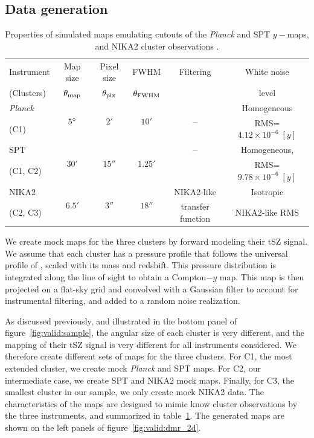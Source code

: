 \subsection{Data generation} \label{sec:simu:mkdata}

\begin{table}[htp]
    \centering
    \begin{tabular}{l c c c c c}
        \toprule
        Instrument & Map size & Pixel size & FWHM & Filtering & White noise \\
        (Clusters) & $\theta_{\rm map}$ & $\theta_{\rm pix}$ & $\theta_{\rm FWHM}$ & & level \\
        \midrule
        \textit{Planck} & \multirow{2}{*}{$5\degree$} & \multirow{2}{*}{$2'$} & \multirow{2}{*}{$10'$} & \multirow{2}{*}{--} & Homogeneous \\
        (C1) & & & & & RMS=$4.12 \times 10^{-6} \; [y]$ \\
        \midrule
        SPT & \multirow{2}{*}{$30'$} & \multirow{2}{*}{$15''$} & \multirow{2}{*}{$1.25'$} & -- & Homogeneous, \\
        (C1, C2) & & & & & RMS=$9.78 \times 10^{-6} \; [y]$ \\
        \midrule
        NIKA2 & \multirow{2}{*}{$6.5'$} & \multirow{2}{*}{$3''$} & \multirow{2}{*}{$18''$} & NIKA2-like & Isotropic \\
        (C2, C3) & & & & transfer function & NIKA2-like RMS \\
        \bottomrule
    \end{tabular}
    \caption{\normalfont
        Properties of simulated maps emulating cutouts of the \textit{Planck} \citep{planck_collaboration_planck_2016} and SPT \citep{bleem_cmbksz_2022} $y-$maps, and NIKA2 cluster observations \citep{keruzore_exploiting_2020}.
    }
    \label{tab:simu:map_props}
\end{table}

We create mock maps for the three clusters by forward modeling their tSZ signal.
We assume that each cluster has a pressure profile that follows the universal profile of \aten, scaled with its mass and redshift.
This pressure distribution is integrated along the line of sight to obtain a Compton$-y$ map.
This map is then projected on a flat-sky grid and convolved with a Gaussian filter to account for instrumental filtering, and added to a random noise realization.

As discussed previously, and illustrated in the bottom panel of figure~\ref{fig:valid:sample}, the angular size of each cluster is very different, and the mapping of their tSZ signal is very different for all instruments considered.
We therefore create different sets of maps for the three clusters.
For C1, the most extended cluster, we create mock \textit{Planck} and SPT maps.
For C2, our intermediate case, we create SPT and NIKA2 mock maps.
Finally, for C3, the smallest cluster in our sample, we only create mock NIKA2 data.
The characteristics of the maps are designed to mimic know cluster observations by the three instruments, and summarized in table~\ref{tab:simu:map_props}.
The generated maps are shown on the left panels of figure~\ref{fig:valid:dmr_2d}.

